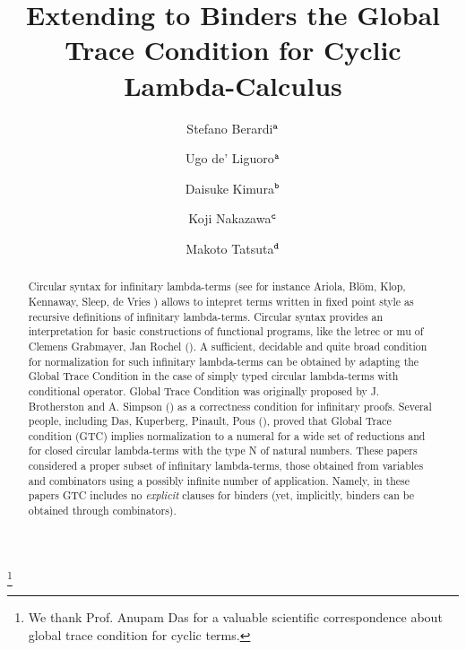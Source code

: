 \documentclass[twoside,11pt]{entics}
\begin{document}
\begin{frontmatter}

  \title{Extending to Binders
  the Global Trace Condition for Cyclic Lambda-Calculus} 
  
 \thanks[ALL]{We thank Prof. Anupam Das for a valuable scientific correspondence about 
 global trace condition for cyclic terms.}   %
  \author{Stefano Berardi$^{\tt a}$}	%
   \author{Ugo de' Liguoro$^{\tt a}$}		%
    \author{Daisuke Kimura$^{\tt b}$}
      \author{Koji Nakazawa$^{\tt c}$}
       \author{Makoto Tatsuta$^{\tt d}$}
   \address[a]{Computer Science Department, Turin University, Torino, Italy}  							
   \address[b]{Department of Information Science, Toho University, Japan} 
   \address[c]{Graduate School of Informatics, Nagoya University, Japan}
   \address[d]{National Institute of Informatics/Sokendai, Tokyo, Japan}
 
 

\begin{abstract} 
Circular syntax for infinitary lambda-terms 
(see for instance Ariola, Bl\"{o}m, Klop, Kennaway, Sleep, de Vries 
\cite{ARIOLA1997154,10.1007/BFb0014548,KENNAWAY199793}) 
allows to intepret terms written in fixed point style 
as recursive definitions of
infinitary lambda-terms. Circular syntax provides an 
interpretation for basic constructions of functional programs, 
like the letrec or mu of Clemens Grabmayer, Jan Rochel 
(\cite{Letrec,Letmu,JanRochelPhd2016}).
A sufficient, decidable and quite broad condition for normalization for such 
infinitary lambda-terms can be obtained
by adapting the Global Trace Condition in the case of simply typed 
circular lambda-terms with conditional operator. 
Global Trace Condition was
originally proposed by J. Brotherston and A. Simpson
(\cite{BrotherstonPhd2006,BrotherstonSimpson2011})
as a correctness condition for infinitary proofs.
Several people, including Das, Kuperberg, Pinault, Pous 
(\cite{2021-Anupam-Das,2021-Anupam-Das,DBLP:conf/fscd/000221,DBLP:conf/lics/Curzi022,DBLP:conf/csl/Curzi023,DBLP:conf/lics/Curzi023}), 
proved that Global Trace condition (GTC) implies normalization to a numeral 
for a wide set of reductions
and for closed circular lambda-terms with the type N of natural numbers. 
These papers considered 
a proper subset of infinitary lambda-terms, those
obtained from variables and combinators using a possibly infinite number of application.
Namely, in these papers GTC includes no \emph{explicit} clauses for binders
(yet, implicitly, binders can be obtained through combinators).


\end{abstract}
\end{frontmatter}
\end{document}
